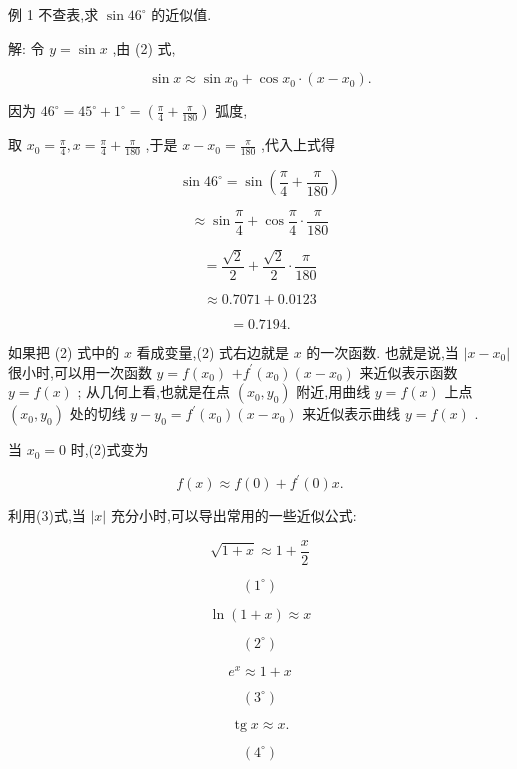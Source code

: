 \documentclass[10pt]{article}
\begin{document}
例 1 不查表,求 \(\sin {46}^{ \circ }\) 的近似值.

解: 令 \(y = \sin x\) ,由 (2) 式,

\[
\sin x \approx \sin {x}_{0} + \cos {x}_{0} \cdot \left( {x - {x}_{0}}\right) .
\]

因为 \({46}^{ \circ } = {45}^{ \circ } + {1}^{ \circ } = \left( {\frac{\pi }{4} + \frac{\pi }{180}}\right)\) 弧度,

取 \({x}_{0} = \frac{\pi }{4},x = \frac{\pi }{4} + \frac{\pi }{180}\) ,于是 \(x - {x}_{0} = \frac{\pi }{180}\) ,代入上式得

\[
\sin {46}^{ \circ } = \sin \left( {\frac{\pi }{4} + \frac{\pi }{180}}\right)
\]

\[
\approx \sin \frac{\pi }{4} + \cos \frac{\pi }{4} \cdot \frac{\pi }{180}
\]

\[
= \frac{\sqrt{2}}{2} + \frac{\sqrt{2}}{2} \cdot \frac{\pi }{180}
\]

\[
\approx {0.7071} + {0.0123}
\]

\[
= {0.7194}\text{.}
\]

如果把 (2) 式中的 \(x\) 看成变量,(2) 式右边就是 \(x\) 的一次函数. 也就是说,当 \(\left| {x - {x}_{0}}\right|\) 很小时,可以用一次函数 \(y = f\left( {x}_{0}\right)\) \(+ {f}^{\prime }\left( {x}_{0}\right) \left( {x - {x}_{0}}\right)\) 来近似表示函数 \(y = f\left( x\right)\) ; 从几何上看,也就是在点 \(\left( {{x}_{0},{y}_{0}}\right)\) 附近,用曲线 \(y = f\left( x\right)\) 上点 \(\left( {{x}_{0},{y}_{0}}\right)\) 处的切线 \(y - {y}_{0} = {f}^{\prime }\left( {x}_{0}\right) \left( {x - {x}_{0}}\right)\) 来近似表示曲线 \(y = f\left( x\right)\) .

当 \({x}_{0} = 0\) 时,(2)式变为

\[
f\left( x\right) \approx f\left( 0\right) + {f}^{\prime }\left( 0\right) x. \tag{3}
\]

利用(3)式,当 \(\left| x\right|\) 充分小时,可以导出常用的一些近似公式:

\[
\sqrt{1 + x} \approx 1 + \frac{x}{2}
\]

\[
\left( {1}^{ \circ }\right)
\]

\[
\ln \left( {1 + x}\right) \approx x
\]

\[
\left( {2}^{ \circ }\right)
\]

\[
{e}^{x} \approx 1 + x
\]

\[
\left( {3}^{ \circ }\right)
\]

\[
\operatorname{tg}x \approx x\text{.}
\]

\[
\left( {4}^{ \circ }\right)
\]
\end{document}

